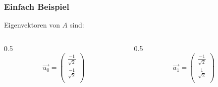 \begin{frame}
    \frametitle{Einfach Beispiel}


    Eigenvektoren von $A$ sind:    
    \begin{columns}[c]
        \begin{column}{0.5\hsize}\centering
            $$ \vec{u_0} = \begin{pmatrix} \frac{-1}{\sqrt{2}}\\ \frac{-1}{\sqrt{2}}\\ \end{pmatrix}$$
        \end{column}
        \begin{column}{0.5\hsize}
            $$\vec{u_1} = \begin{pmatrix} \frac{-1}{\sqrt{2}}\\ \frac{1}{\sqrt{2}}\\ \end{pmatrix}$$
        \end{column}
    \end{columns}

    \hfil


    \hfil

\end{frame}

